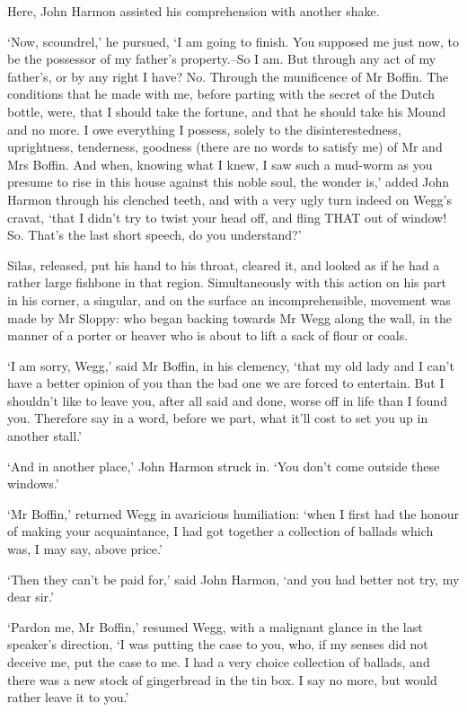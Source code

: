 Here, John Harmon assisted his comprehension with another shake.

‘Now, scoundrel,’ he pursued, ‘I am going to finish. You supposed me
just now, to be the possessor of my father’s property.--So I am. But
through any act of my father’s, or by any right I have? No. Through the
munificence of Mr Boffin. The conditions that he made with me, before
parting with the secret of the Dutch bottle, were, that I should take
the fortune, and that he should take his Mound and no more. I owe
everything I possess, solely to the disinterestedness, uprightness,
tenderness, goodness (there are no words to satisfy me) of Mr and Mrs
Boffin. And when, knowing what I knew, I saw such a mud-worm as you
presume to rise in this house against this noble soul, the wonder is,’
added John Harmon through his clenched teeth, and with a very ugly turn
indeed on Wegg’s cravat, ‘that I didn’t try to twist your head off,
and fling THAT out of window! So. That’s the last short speech, do you
understand?’

Silas, released, put his hand to his throat, cleared it, and looked as
if he had a rather large fishbone in that region. Simultaneously with
this action on his part in his corner, a singular, and on the surface
an incomprehensible, movement was made by Mr Sloppy: who began backing
towards Mr Wegg along the wall, in the manner of a porter or heaver who
is about to lift a sack of flour or coals.

‘I am sorry, Wegg,’ said Mr Boffin, in his clemency, ‘that my old lady
and I can’t have a better opinion of you than the bad one we are forced
to entertain. But I shouldn’t like to leave you, after all said and
done, worse off in life than I found you. Therefore say in a word,
before we part, what it’ll cost to set you up in another stall.’

‘And in another place,’ John Harmon struck in. ‘You don’t come outside
these windows.’

‘Mr Boffin,’ returned Wegg in avaricious humiliation: ‘when I first had
the honour of making your acquaintance, I had got together a collection
of ballads which was, I may say, above price.’

‘Then they can’t be paid for,’ said John Harmon, ‘and you had better not
try, my dear sir.’

‘Pardon me, Mr Boffin,’ resumed Wegg, with a malignant glance in the
last speaker’s direction, ‘I was putting the case to you, who, if my
senses did not deceive me, put the case to me. I had a very choice
collection of ballads, and there was a new stock of gingerbread in the
tin box. I say no more, but would rather leave it to you.’

